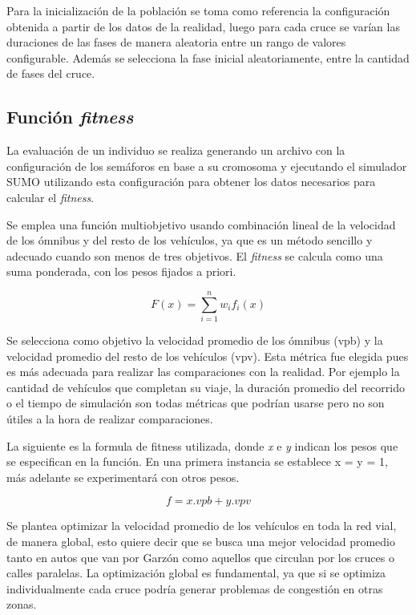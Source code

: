 Para la inicialización de la población se toma como referencia
la configuración obtenida a partir de los datos de la realidad,  luego para cada cruce se varían las duraciones de las fases de manera aleatoria entre un rango de valores configurable. Además se selecciona la fase inicial aleatoriamente, entre la cantidad de fases del cruce.

\subsection{Función \emph{fitness}}


La evaluación de un individuo se realiza generando un archivo con la configuración de los semáforos en base a su cromosoma y ejecutando el simulador SUMO utilizando esta configuración para obtener los datos necesarios para calcular el \emph{fitness}.

Se emplea una función multiobjetivo usando combinación lineal de la velocidad de los ómnibus y del resto de los vehículos, ya que es un método sencillo y adecuado cuando son menos de tres objetivos. El \emph{fitness} se calcula como una suma ponderada, con los pesos fijados a priori.

        \begin{equation}
        \label{eq:funcion_fitness_generica}
		F(x) = \sum_{i=1}^{n}{w_i}{f_i}(x)
        \end{equation}

Se selecciona como objetivo la velocidad promedio de los ómnibus (vpb) y la velocidad promedio del resto de los vehículos (vpv). Esta métrica fue elegida pues es más adecuada para realizar las comparaciones con la realidad. Por ejemplo la cantidad de vehículos que completan su viaje, la duración promedio del recorrido o el tiempo de simulación son todas métricas que podrían usarse pero no son útiles a la hora de realizar comparaciones.

La siguiente es la formula de fitness utilizada, donde \emph{x} e \emph{y} indican los pesos que se especifican en la función. En una primera instancia se establece x = y = 1, más adelante se experimentará con otros pesos.

        \begin{equation}
        \label{eq:funcion_fitness}
        f = x.vpb + y.vpv
        \end{equation}
        


Se plantea optimizar la velocidad promedio de los vehículos en toda la red vial, de manera global, esto quiere decir que se busca una mejor velocidad promedio tanto en autos que van por Garzón como aquellos que circulan por los cruces o calles paralelas. La optimización global es fundamental, ya que si se optimiza individualmente cada cruce podría generar problemas de congestión en otras zonas.

